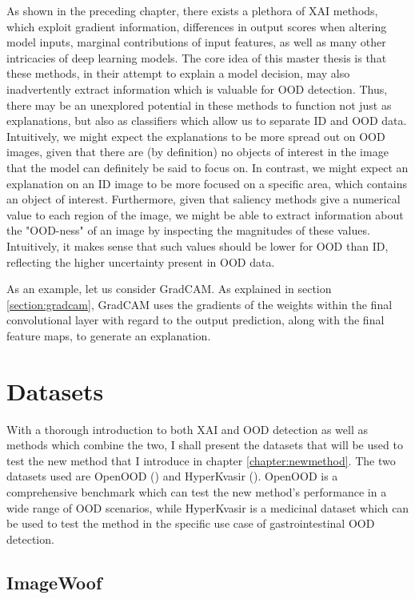 \documentclass[UKenglish]{uiomasterthesis} %
\theoremstyle{definition}
\begin{document}
As shown in the preceding chapter, there exists a plethora of XAI methods, which exploit gradient information, differences in output scores when altering model inputs, marginal contributions of input features, as well as many other intricacies of deep learning models. The core idea of this master thesis is that these methods, in their attempt to explain a model decision, may also inadvertently extract information which is valuable for OOD detection. Thus, there may be an unexplored potential in these methods to function not just as explanations, but also as classifiers which allow us to separate ID and OOD data. Intuitively, we might expect the explanations to be more spread out on OOD images, given that there are (by definition) no objects of interest in the image that the model can definitely be said to focus on. In contrast, we might expect an explanation on an ID image to be more focused on a specific area, which contains an object of interest. Furthermore, given that saliency methods give a numerical value to each region of the image, we might be able to extract information about the "OOD-ness" of an image by inspecting the magnitudes of these values. Intuitively, it makes sense that such values should be lower for OOD than ID, reflecting the higher uncertainty present in OOD data.

As an example, let us consider GradCAM. As explained in section \ref{section:gradcam}, GradCAM uses the gradients of the weights within the final convolutional layer with regard to the output prediction, along with the final feature maps, to generate an explanation.


\section{Datasets}

With a thorough introduction to both XAI and OOD detection as well as methods which combine the two, I shall present the datasets that will be used to test the new method that I introduce in chapter \ref{chapter:newmethod}. The two datasets used are OpenOOD (\cite{openood}) and HyperKvasir (\cite{hyperkvasir}). OpenOOD is a comprehensive benchmark which can test the new method's performance in a wide range of OOD scenarios, while HyperKvasir is a medicinal dataset which can be used to test the method in the specific use case of gastrointestinal OOD detection.

\subsection{ImageWoof}
\end{document}
